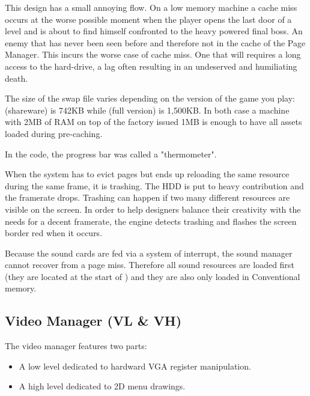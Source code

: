 \documentclass[book.tex]{subfiles}
\begin{document}
\par
This design has a small annoying flow. On a low memory machine a cache miss occurs at the worse possible moment when the player opens the last door of a level and is about to find himself confronted to the heavy powered final boss. An enemy that has never been seen before and therefore not in the cache of the Page Manager. This incurs the worse case of cache miss. One that will requires a long access to the hard-drive, a lag often resulting in an undeserved and humiliating death.\\
\par
The size of the swap file varies depending on the version of the game you play:  (shareware) is 742KB while  (full version) is 1,500KB. In both case a machine with 2MB of RAM on top of the factory issued 1MB is enough to have all assets loaded during pre-caching.\\
\par
{} In the code, the progress bar was called a "thermometer".\\
\par
{} When the system has to evict pages but ends up reloading the same resource during the same frame, it is trashing. The HDD is put to heavy contribution and the framerate drops. Trashing can happen if two many different resources are visible on the screen. In order to help designers balance their creativity with the needs for a decent framerate, the engine detects trashing and flashes the screen border red when it occurs.\\
\par
{} Because the sound cards are fed via a system of interrupt, the sound manager cannot recover from a page miss. Therefore all sound resources are loaded first (they are located at the start of ) and they are also only loaded in Conventional memory.











\subsection{Video Manager (VL \& VH)}
The video manager features two parts:
\begin{itemize}
\item A low level dedicated to hardward VGA register manipulation.
\item A high level dedicated to 2D menu drawings.
\end{itemize}
\par
\end{document}
